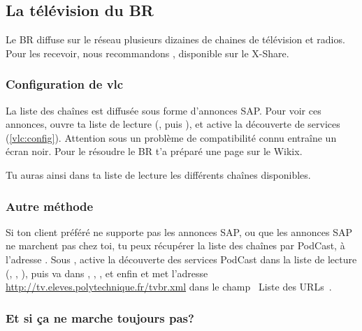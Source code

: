 
\subsection{La télévision du BR}
\label{TV}

Le BR diffuse sur le réseau plusieurs dizaines de chaines de télévision et radios. Pour les recevoir, nous recommandons , disponible sur le X-Share.

\subsubsection{Configuration de vlc}

La liste des cha\^ines est diffusée sous forme d'annonces SAP. Pour voir ces annonces, ouvre ta liste de lecture (, puis ), et active la découverte de services (\ref{vlc:config}).
Attention sous  un probl\`eme de compatibilité connu entra\^ine un écran noir. Pour le résoudre le BR t'a préparé une page sur le Wikix.

\label{vlc:config}

Tu auras ainsi dans ta liste de lecture les différents cha\^{i}nes disponibles.

\subsubsection{Autre méthode}

Si ton client préféré ne supporte pas les annonces SAP, ou que les annonces SAP ne marchent pas chez toi, tu peux récupérer la liste des cha\^ines par
PodCast, à l'adresse . Sous , active la découverte des services PodCast dans la liste de
lecture (, , ), puis va dans , , ,  et enfin  et
met l'adresse \url{http://tv.eleves.polytechnique.fr/tvbr.xml} dans le champ \guillemotleft~Liste des URLs~\guillemotright .

\subsubsection{Et si ça ne marche toujours pas?}

